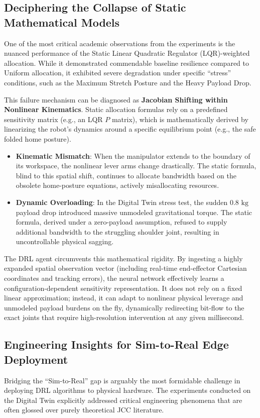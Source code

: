 \subsection{Deciphering the Collapse of Static Mathematical Models}
One of the most critical academic observations from the experiments is the nuanced performance of the Static Linear Quadratic Regulator (LQR)-weighted 
allocation. While it demonstrated commendable baseline resilience compared to Uniform allocation, it exhibited severe degradation under specific ``stress'' conditions, such as the Maximum Stretch Posture and the Heavy Payload Drop.

This failure mechanism can be diagnosed as \textbf{Jacobian Shifting within Nonlinear Kinematics}. Static allocation formulas rely on a predefined 
sensitivity matrix (e.g., an LQR $P$ matrix), which is mathematically derived by linearizing the robot's dynamics around a specific 
equilibrium point (e.g., the safe folded home posture).
\begin{itemize}
    \item \textbf{Kinematic Mismatch}: When the manipulator extends to the boundary of its workspace, the nonlinear lever arms change drastically. The static formula, blind to this spatial shift, continues to allocate bandwidth based on the obsolete home-posture equations, actively misallocating resources.
    \item \textbf{Dynamic Overloading}: In the Digital Twin stress test, the sudden $0.8\text{ kg}$ payload drop introduced massive unmodeled gravitational torque. The static formula, derived under a zero-payload assumption, refused to supply additional bandwidth to the struggling shoulder joint, resulting in uncontrollable physical sagging.
\end{itemize}
The DRL agent circumvents this mathematical rigidity. By ingesting a highly expanded spatial observation vector (including real-time end-effector Cartesian coordinates and tracking errors), the neural network effectively learns a configuration-dependent sensitivity representation. It does not rely on a fixed linear approximation; instead, it can adapt to nonlinear physical leverage and unmodeled payload burdens on the fly, dynamically 
redirecting bit-flow to the exact joints that require high-resolution intervention at any given millisecond.
\subsection{Engineering Insights for Sim-to-Real Edge Deployment}
Bridging the ``Sim-to-Real'' gap is arguably the most formidable challenge in deploying DRL algorithms to physical hardware. The experiments 
conducted on the Digital Twin explicitly addressed critical engineering phenomena that are often glossed over purely theoretical JCC literature.
